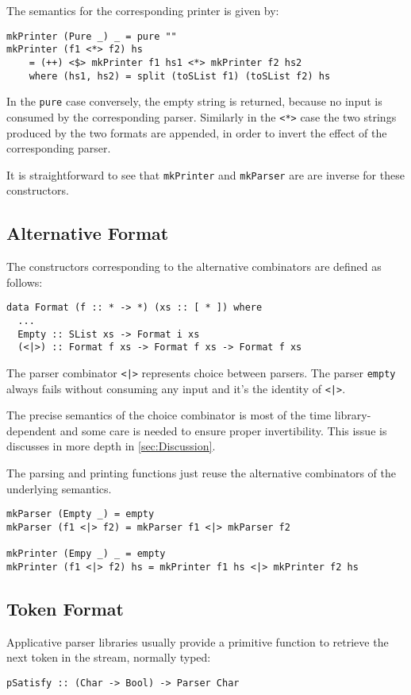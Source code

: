 \documentclass[../Thesis.tex]{subfiles}
\begin{document}
The semantics for the corresponding printer is given by:
\begin{verbatim}
mkPrinter (Pure _) _ = pure ""
mkPrinter (f1 <*> f2) hs 
	= (++) <$> mkPrinter f1 hs1 <*> mkPrinter f2 hs2
    where (hs1, hs2) = split (toSList f1) (toSList f2) hs
\end{verbatim} 
In the \texttt{pure} case conversely, the empty string is returned, because no input is consumed by the corresponding parser.
Similarly in the \texttt{<*>} case the two strings produced by the two formats are appended, in order to invert the effect of the corresponding parser.

It is straightforward to see that \texttt{mkPrinter} and \texttt{mkParser} are are inverse for these constructors.

\subsection{Alternative Format}
The constructors corresponding to the alternative combinators are defined as follows:

\begin{verbatim}
data Format (f :: * -> *) (xs :: [ * ]) where
  ...
  Empty :: SList xs -> Format i xs
  (<|>) :: Format f xs -> Format f xs -> Format f xs
\end{verbatim}

The parser combinator \texttt{<|>} represents choice between parsers.
The parser \texttt{empty} always fails without consuming any input and it's 
the identity of \texttt{<|>}.

The precise semantics of the choice combinator is most of the time library-dependent and some care is needed to ensure proper invertibility. 
This issue is discusses in more depth in \ref{sec:Discussion}.

The parsing and printing functions just reuse the alternative combinators
of the underlying semantics.

\begin{verbatim}
mkParser (Empty _) = empty
mkParser (f1 <|> f2) = mkParser f1 <|> mkParser f2

mkPrinter (Empy _) _ = empty
mkPrinter (f1 <|> f2) hs = mkPrinter f1 hs <|> mkPrinter f2 hs
\end{verbatim}

\subsection{Token Format}
Applicative parser libraries usually provide a primitive function to retrieve the next token in the stream, normally typed:
\begin{verbatim}
pSatisfy :: (Char -> Bool) -> Parser Char
\end{verbatim}
\end{document}
